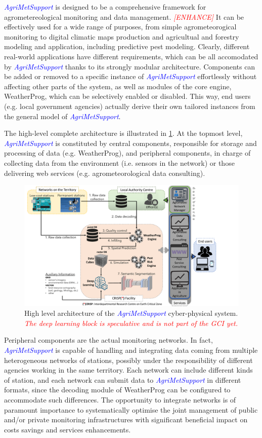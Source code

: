 \documentclass[authoryear,preprint,review,12pt]{elsarticle}
\newcommand{\note}[1]{\emph{\textcolor{red}{#1}}}
\newcommand{\update}[1]{\emph{\textcolor{blue}{#1}}}
\newcommand{\gci}{\update{AgriMetSupport}\xspace}
\begin{document}
\gci is designed to be a comprehensive framework for agrometereological monitoring and data management.
\note{[ENHANCE]} It can be effectively used for a wide range of purposes, from simple agrometeorogical monitoring to digital climatic maps production and agricultual and forestry modeling and application, including predictive pest modeling.
Clearly, different real-world applications have different requirements, which can be all accomodated by \gci thanks to its strongly modular architecture.
Components can be added or removed to a specific instance of \gci effortlessly without affecting other parts of the system, as well as modules of the core engine, WeatherProg, which can be selectively enabled or disabled.
This way, end users (e.g. local government agencies) actually derive their own tailored instances from the general model of \gci.

The high-level complete architecture is illustrated in \cref{cyberPhysicalSystemFig}.
At the topmost level, \gci is constituted by central components, responsible for storage and processing of data (e.g. WeatherProg), and peripheral components, in charge of collecting data from the environment (i.e. sensors in the network) or those delivering web services (e.g. agrometeorological data consulting).

\begin{figure}
	\centering
	\includegraphics[scale=.5]{figures/fullSystem_GCI.pdf}
	\caption{High level architecture of the \gci cyber-physical system. \note{The deep learning block is speculative and is not part of the GCI yet.}}
	\label{cyberPhysicalSystemFig}
\end{figure}

Peripheral components are the actual monitoring networks.
In fact, \gci is capable of handling and integrating data coming from multiple heterogeneous networks of stations, possibly under the responsibility of different agencies working in the same territory.
Each network can include different kinds of station, and each network can submit data to \gci in different formats, since the decoding module of WeatherProg can be configured to accommodate such differences.
The opportunity to integrate networks is of paramount importance to systematically optimise the joint management of public and/or private monitoring infrastructures with significant beneficial impact on costs savings and services enhancements.
\end{document}
